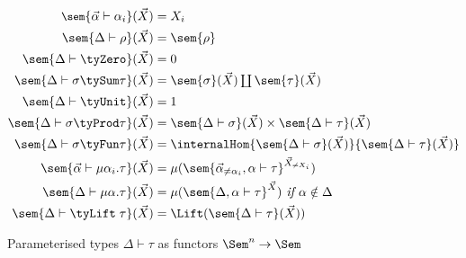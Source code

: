 \begin{figure}
  \begin{align*}
  \small
  \sem{\vec\alpha \vdash \alpha_i}(\vec X) &=
  X_i
  \\
  \sem{\Delta \vdash \rho}(\vec X) &=
  \sem{\rho}
  \\
  \sem{\Delta \vdash \tyZero}(\vec X) &=
  0
  \\
  \sem{\Delta \vdash \sigma \tySum \tau}(\vec X) &=
  \textstyle {\sem{\sigma}(\vec X)} \coprod {\sem{\tau}(\vec X)}
  \\
  \sem{\Delta \vdash \tyUnit}(\vec X) &=
  1
  \\
  \sem{\Delta \vdash \sigma \tyProd \tau}(\vec X) &=
  \sem{\Delta \vdash \sigma}(\vec X) \times \sem{\Delta \vdash \tau}(\vec X)
  \\
  \sem{\Delta \vdash \sigma \tyFun \tau}(\vec X) &=
  \internalHom{\sem{\Delta \vdash \sigma}(\vec X)}{\sem{\Delta \vdash \tau}(\vec X)}
  \\
  \sem{\vec\alpha \vdash \mu\alpha_i.\tau}(\vec X) &=
  \mu(\sem{\vec\alpha_{\neq \alpha_i}, \alpha \vdash \tau}^{\vec X_{\neq X_i}})
  \\
  \sem{\Delta \vdash \mu\alpha.\tau}(\vec X) &=
  \mu(\sem{\Delta, \alpha \vdash \tau}^{\vec X})
  \textit{ if }\alpha \notin \Delta
  \\
  \sem{\Delta \vdash \tyLift\;\tau}(\vec X) &=
  \Lift(\sem{\Delta \vdash \tau}(\vec X))
  \end{align*}
  \caption{Parameterised types $\Delta \vdash \tau$ as functors $\Sem^n \to \Sem$ }
  \label{fig:semantics:types}
\end{figure}
